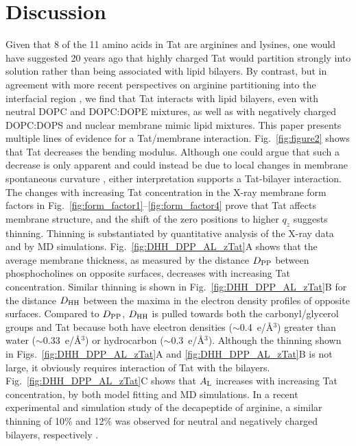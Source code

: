 

\section{Discussion}\label{sec:discussion}
Given that 8 of the 11 amino acids in Tat are arginines and lysines, 
one would have
suggested 20 years ago that highly charged Tat would partition strongly into 
solution rather than
being associated with lipid bilayers. By contrast, but in agreement with more 
recent perspectives
on arginine partitioning into the interfacial region \cite{Johansson09}, 
we find that Tat interacts with lipid bilayers, even with neutral DOPC and 
DOPC:DOPE mixtures, as well as with negatively
charged DOPC:DOPS and nuclear membrane mimic lipid mixtures. 
This paper presents multiple lines of evidence for a Tat/membrane interaction. 
Fig.~\ref{fig:figure2} shows that Tat decreases the bending modulus. 
Although one could argue that such a decrease is only apparent 
and could instead be due to local changes in membrane spontaneous curvature 
\cite{Tristram-Nagle07_BPJ}, either interpretation supports a Tat-bilayer 
interaction. The changes with increasing Tat concentration in the X-ray
membrane form factors in Fig.~\ref{fig:form_factor1}--\ref{fig:form_factor4} 
prove that Tat affects 
membrane structure, and the shift of the zero positions to higher $q_z$ 
suggests thinning. Thinning is substantiated by quantitative analysis
of the X-ray data and by MD simulations. 
Fig.~\ref{fig:DHH_DPP_AL_zTat}A shows that the average membrane thickness, 
as measured by the distance $D_\textrm{PP}$ between phosphocholines on opposite surfaces, 
decreases with increasing Tat concentration. 
Similar thinning is shown in Fig.~\ref{fig:DHH_DPP_AL_zTat}B for the distance 
$D_\textrm{HH}$ between the maxima in the electron density profiles of opposite surfaces.  
Compared to $D_\textrm{PP}$, $D_\textrm{HH}$ is 
pulled towards both the carbonyl/glycerol groups and Tat because both have 
electron densities ($\sim$0.4~e/\AA$^3$) greater than water ($\sim$0.33~e/\AA$^3$) or 
hydrocarbon ($\sim$0.3~e/\AA$^3$). 
Although the thinning shown in Figs.~\ref{fig:DHH_DPP_AL_zTat}A 
and \ref{fig:DHH_DPP_AL_zTat}B
is not large, it obviously requires interaction of Tat with the bilayers. 
Fig.~\ref{fig:DHH_DPP_AL_zTat}C shows that $A_\textrm{L}$ increases with increasing 
Tat concentration, by both model fitting and MD simulations.
In a recent experimental and simulation study of the decapeptide of arginine, 
a similar thinning of 10\% and 12\% was observed for neutral and negatively charged 
bilayers, respectively \cite{Vazdar13}.

